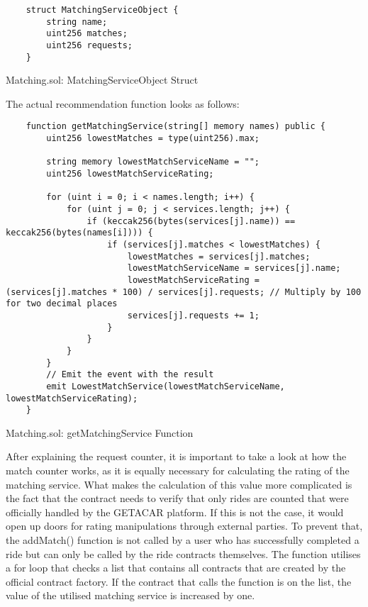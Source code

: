 \lstset{
  basicstyle=\footnotesize\ttfamily,
  breaklines=true,
  numbers=left,
  firstnumber=6
}

\begin{Listing}
\begin{lstlisting}
    struct MatchingServiceObject {
        string name;
        uint256 matches;
        uint256 requests;
    }
\end{lstlisting}
  \caption{Matching.sol: MatchingServiceObject Struct}
  \label{lst:MatchingServiceObject}
\end{Listing}


The actual recommendation function looks as follows: 

\lstset{
  basicstyle=\footnotesize\ttfamily,
  breaklines=true,
  numbers=left,
  firstnumber=59
}

\begin{Listing}
\begin{lstlisting}
    function getMatchingService(string[] memory names) public {
        uint256 lowestMatches = type(uint256).max;

        string memory lowestMatchServiceName = "";
        uint256 lowestMatchServiceRating;

        for (uint i = 0; i < names.length; i++) {
            for (uint j = 0; j < services.length; j++) {
                if (keccak256(bytes(services[j].name)) == keccak256(bytes(names[i]))) {
                    if (services[j].matches < lowestMatches) {
                        lowestMatches = services[j].matches;
                        lowestMatchServiceName = services[j].name;
                        lowestMatchServiceRating = (services[j].matches * 100) / services[j].requests; // Multiply by 100 for two decimal places
                        services[j].requests += 1;
                    }
                }
            }
        }
        // Emit the event with the result
        emit LowestMatchService(lowestMatchServiceName, lowestMatchServiceRating);
    }
\end{lstlisting}
  \caption{Matching.sol: getMatchingService Function}
  \label{lst:getMatchingService}
\end{Listing}

After explaining the request counter, it is important to take a look at how the match counter works, as it is equally necessary for calculating the rating of the matching service. What makes the calculation of this value more complicated is the fact that the contract needs to verify that only rides are counted that were officially handled by the GETACAR platform. If this is not the case, it would open up doors for rating manipulations through external parties. To prevent that, the addMatch() function is not called by a user who has successfully completed a ride but can only be called by the ride contracts themselves. The function utilises a for loop that checks a list that contains all contracts that are created by the official contract factory. If the contract that calls the function is on the list, the value of the utilised matching service is increased by one.

